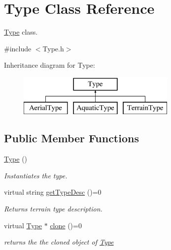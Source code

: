 \hypertarget{classType}{}\section{Type Class Reference}
\label{classType}


\hyperlink{classType}{Type} class.  




{\ttfamily \#include $<$Type.\+h$>$}

Inheritance diagram for Type\+:\begin{figure}[H]
\begin{center}
\leavevmode
\includegraphics[height=2.000000cm]{classType}
\end{center}
\end{figure}
\subsection*{Public Member Functions}
\begin{DoxyCompactItemize}
\item 
\mbox{\label{classType_a78339313d36891f18427c431ea84e306}} 
\hyperlink{classType_a78339313d36891f18427c431ea84e306}{Type} ()
\begin{DoxyCompactList}\small\item\em Instantiates the type. \end{DoxyCompactList}\item 
virtual string \hyperlink{classType_a5c453300dc060252c30534110bd2f78c}{get\+Type\+Desc} ()=0
\begin{DoxyCompactList}\small\item\em Returns terrain type description. \end{DoxyCompactList}\item 
virtual \hyperlink{classType}{Type} $\ast$ \hyperlink{classType_a7b79d264e2cbac9c091cdb41ffb112c9}{clone} ()=0
\begin{DoxyCompactList}\small\item\em returns the the cloned object of \hyperlink{classType}{Type} \end{DoxyCompactList}\end{DoxyCompactItemize}


